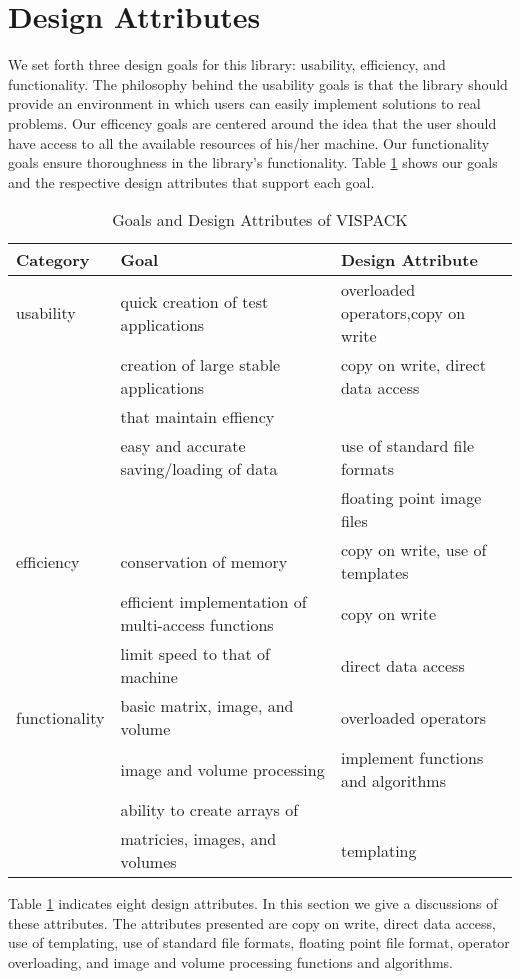\section{Design Attributes}
We set forth three design goals for this library:
usability, efficiency, and functionality.  The philosophy
behind the usability goals is that the library should provide an
environment in which users can easily implement solutions to real
problems.  Our efficency goals are centered around the idea that
the user should have access to all the available resources of his/her
machine.  Our functionality goals ensure
thoroughness in the library's functionality.  Table \ref{goals}
shows our goals and the respective design attributes that support each goal.
\begin{table}[b]
\centering
\caption{Goals and Design Attributes of VISPACK} 
\begin{tabular}{lll} \hline
Category& Goal & Design Attribute  \\ \hline
usability& quick creation of test applications&overloaded operators,copy on write\\
&creation of large stable applications &copy on write, direct data access\\
&\hspace*{0.25in}that maintain effiency&\\
&easy and accurate saving/loading of data&use of standard file formats\\
&&floating point image files\\ \hline
efficiency&conservation of memory&copy on write, use of templates\\
&efficient implementation of multi-access functions&copy on write\\
&limit speed to that of machine&direct data access\\ \hline
functionality&basic matrix, image, and volume&overloaded operators\\
&image and volume processing&implement functions and algorithms\\
&ability to create arrays of& \\
&\hspace*{0.25in}matricies, images, and volumes&templating
\end{tabular}
\label{goals}
\end{table}

Table \ref{goals} indicates eight design attributes.   In this section we
give a discussions of these attributes.
The attributes presented are copy on write, direct data access,
use of templating, use of standard file formats, floating point file format,
operator overloading, and image and volume processing functions and
algorithms.

